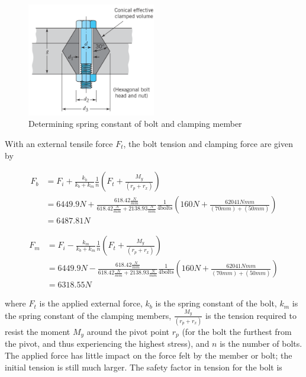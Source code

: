 \begin{figure}
    \centering
    \includegraphics[width=0.5\textwidth]{4_Analysis/img/Bolts/BoltTensionDiagram.png}
    \caption{Determining spring constant of bolt and clamping member \cite{juvinall_fundamentals_2012}}
    \label{fig:bolts_spring_constant}
\end{figure}{}

With an external tensile force $F_t$, the bolt tension and clamping force are given by

\begin{equation}{} \label{eq:bolts_tension_force} 
    \begin{split}
        F_b &= F_i + \frac{k_b}{k_b + k_m} \frac{1}{n} \left(F_t + \frac{M_y}{(r_p + r_x)}\right)
        \\
        &= 6449.9N + \frac{618.42\frac{N}{mm}}{618.42\frac{N}{mm} + 2138.93\frac{N}{mm}} \frac{1}{4\text{bolts}} \left( 160N + \frac{62041Nmm}{(70mm) + (50mm)} \right) 
        \\
        &= 6487.81N 
    \end{split}{}
\end{equation}

\begin{equation}
    \begin{split}
        F_m &= F_i - \frac{k_m}{k_b + k_m} \frac{1}{n} \left(F_t + \frac{M_y}{(r_p + r_x)}\right) 
        \\
        &= 6449.9N - \frac{618.42\frac{N}{mm}}{618.42\frac{N}{mm} + 2138.93\frac{N}{mm}} \frac{1}{4\text{bolts}} \left( 160N + \frac{62041Nmm}{(70mm) + (50mm)} \right)
        \\
        &= 6318.55N
    \end{split}{}
\end{equation}{}

where $F_t$ is the applied external force, $k_b$ is the spring constant of the bolt,  $k_m$ is the spring constant of the clamping members,  $\frac{M_y}{(r_p + r_x)}$ is the tension required to resist the moment $M_y$ around the pivot point $r_p$ (for the bolt the furthest from the pivot, and thus experiencing the highest stress), and $n$ is the number of bolts.
The applied force has little impact on the force felt by the member or bolt; the initial tension is still much larger.
The safety factor in tension for the bolt is

